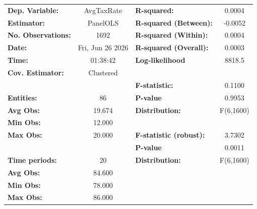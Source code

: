 \begin{center}
\begin{tabular}{lclc}
\toprule
\textbf{Dep. Variable:}                       &     AvgTaxRate     & \textbf{  R-squared:         }   &      0.0004      \\
\textbf{Estimator:}                           &      PanelOLS      & \textbf{  R-squared (Between):}  &     -0.0052      \\
\textbf{No. Observations:}                    &        1692        & \textbf{  R-squared (Within):}   &      0.0004      \\
\textbf{Date:}                                &  Fri, Jun 26 2026  & \textbf{  R-squared (Overall):}  &      0.0003      \\
\textbf{Time:}                                &      01:38:42      & \textbf{  Log-likelihood     }   &      8818.5      \\
\textbf{Cov. Estimator:}                      &     Clustered      & \textbf{                     }   &                  \\
\textbf{}                                     &                    & \textbf{  F-statistic:       }   &      0.1100      \\
\textbf{Entities:}                            &         86         & \textbf{  P-value            }   &      0.9953      \\
\textbf{Avg Obs:}                             &       19.674       & \textbf{  Distribution:      }   &    F(6,1600)     \\
\textbf{Min Obs:}                             &       12.000       & \textbf{                     }   &                  \\
\textbf{Max Obs:}                             &       20.000       & \textbf{  F-statistic (robust):} &      3.7302      \\
\textbf{}                                     &                    & \textbf{  P-value            }   &      0.0011      \\
\textbf{Time periods:}                        &         20         & \textbf{  Distribution:      }   &    F(6,1600)     \\
\textbf{Avg Obs:}                             &       84.600       & \textbf{                     }   &                  \\
\textbf{Min Obs:}                             &       78.000       & \textbf{                     }   &                  \\
\textbf{Max Obs:}                             &       86.000       & \textbf{                     }   &                  \\

\end{tabular}
\end{center}
